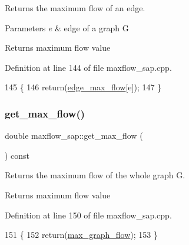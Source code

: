 Returns the maximum flow of an edge.


\begin{DoxyParams}{Parameters}
{\em e} & edge of a graph {\ttfamily G} \\
\hline
\end{DoxyParams}
\begin{DoxyReturn}{Returns}
maximum flow value 
\end{DoxyReturn}


Definition at line 144 of file maxflow\+\_\+sap.\+cpp.


\begin{DoxyCode}
145 \{
146     \textcolor{keywordflow}{return}(\mbox{\hyperlink{classmaxflow__sap_a25820db833a98efc69fc3edb79fc49d3}{edge\_max\_flow}}[e]);
147 \}
\end{DoxyCode}
\mbox{\label{classmaxflow__sap_a81251d546cbdabc837f24fc3caf9fe0d}} 
\subsubsection{\texorpdfstring{get\+\_\+max\+\_\+flow()}{get\_max\_flow()}\hspace{0.1cm}{\footnotesize\ttfamily [2/2]}}
{\footnotesize\ttfamily double maxflow\+\_\+sap\+::get\+\_\+max\+\_\+flow (\begin{DoxyParamCaption}{ }\end{DoxyParamCaption}) const}

Returns the maximum flow of the whole graph G.

\begin{DoxyReturn}{Returns}
maximum flow value 
\end{DoxyReturn}


Definition at line 150 of file maxflow\+\_\+sap.\+cpp.


\begin{DoxyCode}
151 \{
152     \textcolor{keywordflow}{return}(\mbox{\hyperlink{classmaxflow__sap_a77c650fd11632352a1228f2cbd38caf1}{max\_graph\_flow}});
153 \}
\end{DoxyCode}
\mbox{\label{classmaxflow__sap_a634835664542d5d181e1b63b99dda36c}} 
